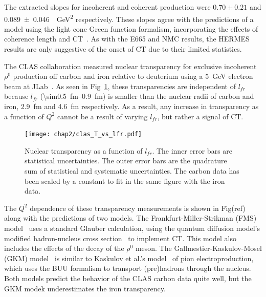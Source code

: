The extracted slopes for incoherent and coherent production were $0.70\pm0.21$
and \SI{0.089\pm0.046}{\per\giga\electronvolt\squared} respectively.
These slopes agree with the predictions of a model using the light cone Green
function formalism, incorporating the effects of coherence length and
CT~\cite{Kopeliovich_2002}.
As with the E665 and NMC results, the HERMES results are only suggestive of the
onset of CT due to their limited statistics.


The CLAS collaboration measured nuclear transparency for exclusive
incoherent $\rho^0$ production off carbon and iron relative to deuterium using
a \SI{5}{\giga\electronvolt} electron beam at JLab~\cite{ElFassi_2012}.
As seen in Fig~\ref{fig:clas_T_vs_lfr}, these transparencies are independent of
$l_{fr}$ because $l_{fr}$ (\SIrange{\sim0.5}{0.9}{\femto\meter}) is smaller
than the nuclear radii of carbon and iron, \SI{2.9}{\femto\meter} and
\SI{4.6}{\femto\meter} respectively.
As a result, any increase in transparency as a function of $Q^2$ cannot be a
result of varying $l_{fr}$, but rather a signal of CT.

\begin{figure}[!h]
    \centering
    \texttt{[image: chap2/clas\_T\_vs\_lfr.pdf]}
    \caption[Nuclear transparency as a function of $l_{fr}$.]{
            Nuclear transparency as a function of $l_{fr}$.
            The inner error bars are statistical uncertainties.
            The outer error bars are the quadrature sum of statistical and
            systematic uncertainties.
            The carbon data has been scaled by a constant to fit in the same
            figure with the iron data.
            }
    \label{fig:clas_T_vs_lfr}
\end{figure}

The $Q^2$ dependence of these transparency measurements is shown in Fig(ref)
along with the predictions of two models.
The Frankfurt-Miller-Strikman (FMS) model~\cite{Frankfurt_2008} uses a standard
Glauber calculation, using the quantum diffusion model's modified
hadron-nucleus cross section~\cite{Farrar_1988} to implement CT. This model
also includes the effects of the decay of the $\rho^0$ meson.
The Gallmestier-Kaskulov-Mosel (GKM) model~\cite{Gallmeister_2011} is similar
to Kaskulov et al.'s model~\cite{Kaskulov_2008} of pion electroproduction,
which uses the BUU formalism to transport (pre)hadrons through the nucleus.
Both models predict the behavior of the CLAS carbon data quite well, but the
GKM modek underestimates the iron transparency.

